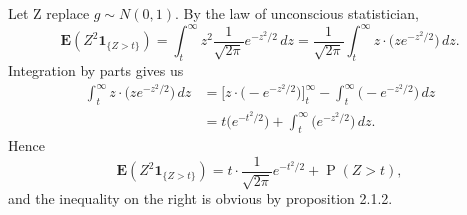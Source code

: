 \documentclass[11pt]{article}
\renewcommand{\Pr}{\operatorname{P}}
\newcommand{\E}{\mathbf{E}}
\newcommand{\I}[1]{\mathbf{1}_{\{#1\}}}
\theoremstyle{plain}
\theoremstyle{definition}
\theoremstyle{remark}
\theoremstyle{definition}
\newenvironment{mansol}[1]{%
  \renewcommand\themansolinner{#1}%
  \mansolinner
}{\endmansolinner}
\begin{document}
\begin{mansol}{2.1.4}
Let Z replace $g \sim N(0,1)$. By the law of unconscious statistician, 
\[
\E(Z^2 \I{Z > t}) = \int_t^\infty z^2 \frac{1}{\sqrt{2\pi}} e^{-z^2 / 2}\,dz 
= \frac{1}{\sqrt{2\pi}}\int_t^\infty z \cdot \bigl(z e^{-z^2 / 2}\bigr)\,dz.
\]
Integration by parts gives us \begin{align*}
\int_t^\infty z \cdot \bigl(z e^{-z^2 / 2}\bigr)\,dz & = \bigl[z \cdot \bigl(- e^{-z^2 / 2}\bigr)\bigr]_t^\infty - \int_t^\infty \bigl(- e^{-z^2/2}\bigr)\,dz \\
& = t \bigl(e^{-t^2 / 2}\bigr) + \int_t^\infty \bigl(e^{-z^2/2}\bigr)\,dz.
\end{align*}
Hence \[
\E(Z^2 \I{Z > t}) = t \cdot \frac{1}{\sqrt{2\pi}} e^{-t^2/2} + \Pr(Z > t),
\] and the inequality on the right is obvious by proposition 2.1.2.
\end{mansol}
\end{document}
